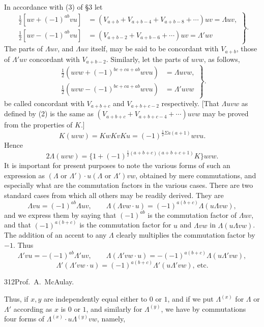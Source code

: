 \documentclass[11pt]{article}
\begin{document}
In accordance with (3) of §3 let
\begin{equation}\left.\begin{aligned}\tfrac12[uv+(-1)^{ab}vu]&=(V_{a+b}+V_{a+b-4}+V_{a+b-8}+\cdots)uv=\Lambda uv,\\\tfrac12[uv-(-1)^{ab}vu]&=(V_{a+b-2}+V_{a+b-6}+\cdots)uv=\Lambda'uv\end{aligned}\right\}.\tag{1}\end{equation}
The parts of $\Lambda uv$, and $\Lambda uv$ itself, may be said to be concordant with $V_{a+b}$, those of $\Lambda'uv$ concordant with $V_{a+b-2}$. Similarly, let the parts of $uvw$, as follows,
\begin{equation}\left.\begin{aligned}\tfrac12(uvw+(-1)^{bc+ca+ab}wvu)&=\Lambda uvw,\\\tfrac12(uvw-(-1)^{bc+ca+ab}wvu)&=\Lambda'uvw\end{aligned}\right\}.\tag{2}\end{equation}
be called concordant with $V_{a+b+c}$ and $V_{a+b+c-2}$ respectively. [That $\Lambda uvw$ as defined by (2) is the same as $(V_{a+b+c}+V_{a+b+c-4}+\cdots)uvw$ may be proved from the properties of $K$.]
\[K(uvw)=KwKvKu=(-1)^{\frac12\Sigma a(a+1)}wvu.\]
Hence
\[2\Lambda(uvw)=\{1+(-1)^{\frac12(a+b+c)(a+b+c+1)}K\}uvw.\]
It is important for present purposes to note the various forms of such an expression as $(\Lambda\text{ or }\Lambda')\cdot u(\Lambda\text{ or }\Lambda')vw$, obtained by mere commutations, and especially what are the commutation factors in the various cases. There are two standard cases from which all others may be readily derived. They are
\[\Lambda vu=(-1)^{ab}\Lambda uv,\qquad\Lambda(\Lambda vw\cdot u)=(-1)^{a(b+c)}\Lambda(u\Lambda vw),\]
and we express them by saying that $(-1)^{ab}$ is the commutation factor of $\Lambda uv$, and that $(-1)^{a(b+c)}$ is the commutation factor for $u$ and $\Lambda vw$ in $\Lambda(u\Lambda vw)$. The addition of an accent to any $\Lambda$ clearly multiplies the commutation factor by $-1$. Thus
\[\Lambda'vu=-(-1)^{ab}\Lambda'uv,\qquad\Lambda(\Lambda'vw\cdot u)=-(-1)^{a(b+c)}\Lambda(u\Lambda'vw),\]
\[\Lambda'(\Lambda'vw\cdot u)=(-1)^{a(b+c)}\Lambda'(u\Lambda'vw),\ \text{etc.}\]
\newpage\thispagestyle{empty}\begin{center}312\hfill Prof.\ A.\ McAulay.\end{center}
Thus, if $x,y$ are independently equal either to $0$ or $1$, and if we put $\Lambda^{(x)}$ for $\Lambda$ or $\Lambda'$ according as $x$ is $0$ or $1$, and similarly for $\Lambda^{(y)}$, we have by commutations four forms of $\Lambda^{(x)}\cdot u\Lambda^{(y)}vw$, namely,
\end{document}

